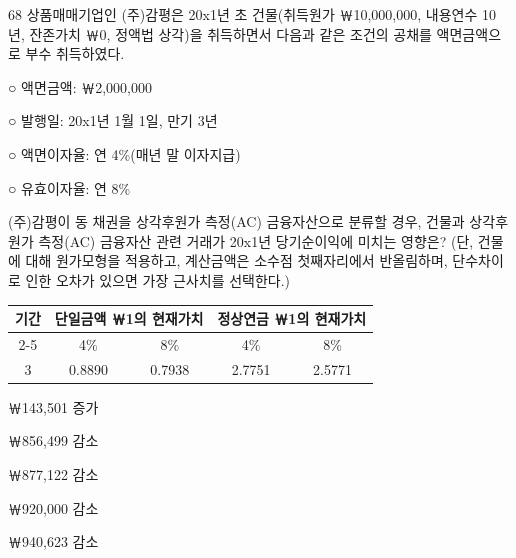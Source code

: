 \begin{question}{68}
상품매매기업인 (주)감평은 20x1년 초 건물(취득원가 ￦10,000,000, 내용연수 10년, 잔존가치 ￦0, 정액법 상각)을 취득하면서 다음과 같은 조건의 공채를 액면금액으로 부수 취득하였다.
\begin{framedtext}
○ 액면금액: ￦2,000,000 \par
○ 발행일: 20x1년 1월 1일, 만기 3년 \par
○ 액면이자율: 연 4\%(매년 말 이자지급) \par
○ 유효이자율: 연 8\% \par
\end{framedtext}
(주)감평이 동 채권을 상각후원가 측정(AC) 금융자산으로 분류할 경우, 건물과 상각후원가 측정(AC) 금융자산 관련 거래가 20x1년 당기순이익에 미치는 영향은? (단, 건물에 대해 원가모형을 적용하고, 계산금액은 소수점 첫째자리에서 반올림하며, 단수차이로 인한 오차가 있으면 가장 근사치를 선택한다.)
\par{\small\centering\begin{tabular}{|c|c|c|c|c|}\hline
\multirow{2}{*}{기간} & \multicolumn{2}{c|}{단일금액 ￦1의 현재가치} & \multicolumn{2}{c|}{정상연금 ￦1의 현재가치} \\ \cline{2-5}
 & 4\% & 8\% & 4\% & 8\% \\ \hline
3 & 0.8890 & 0.7938 & 2.7751 & 2.5771 \\ \hline
\end{tabular}\par}
\begin{choices}
  \item ￦143,501 증가
  \item ￦856,499 감소
  \item ￦877,122 감소
  \item ￦920,000 감소
  \item ￦940,623 감소
\end{choices}
\end{question}
